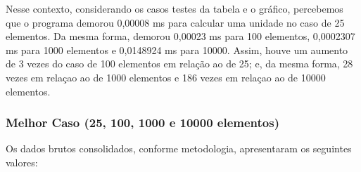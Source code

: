 \documentclass[a4paper, 12pt]{article}
\begin{document}
\vspace{0.8cm}
Nesse contexto, considerando os casos testes da tabela e o gráfico, percebemos que o programa demorou 0,00008 ms para calcular uma unidade no caso de 25 elementos. Da mesma forma, demorou 0,00023 ms para 100 elementos, 0,0002307 ms para 1000 elementos e 0,0148924 ms para 10000. Assim, houve um aumento de 3 vezes do caso de 100 elementos em relação ao de 25; e, da mesma forma, 28 vezes em relaçao ao de 1000 elementos e 186 vezes em relaçao ao de 10000 elementos.

\subsubsection{Melhor Caso (25, 100, 1000 e 10000 elementos)}

\tab{ }Os dados brutos consolidados, conforme metodologia, apresentaram os seguintes valores:
\vspace{0.2cm}
\end{document}
